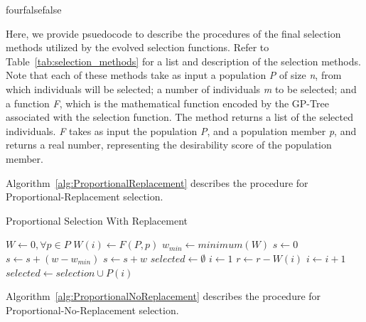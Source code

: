 \documentclass[times,12pt,titlepage]{mstogs}
\begin{document}

\begin{ThesisAppendix}{four}{false}{false}


\label{apx:SelectionPsuedocode}

Here, we provide psuedocode to describe the procedures of the final selection methods utilized by the evolved selection functions. Refer to Table~\ref{tab:selection_methods} for a list and description of the selection methods. Note that each of these methods take as input a population \textit{P} of size \textit{n}, from which individuals will be selected; a number of individuals \textit{m} to be selected; and a function \textit{F}, which is the mathematical function encoded by the GP-Tree associated with the selection function. The method returns a list of the selected individuals. \textit{F} takes as input the population \textit{P}, and a population member \textit{p}, and returns a real number, representing the desirability score of the population member.

Algorithm~\ref{alg:ProportionalReplacement} describes the procedure for Proportional-Replacement selection.

\begin{algorithm}
\caption{Proportional Selection With Replacement}
\label{alg:ProportionalReplacement}
\begin{algorithmic}[1]
 \label{proc:ProportionalReplacement}
	\State $W \leftarrow 0,\forall p \in P$
		\State $W(i) \leftarrow F(P,p)$
	\EndFor
	\State $w_{min} \leftarrow minimum(W)$	
	\State $s \leftarrow 0$
			\State $s \leftarrow s + (w - w_{min} )$			
		\Else
			\State $s \leftarrow s + w$		
		\EndIf	
	\EndFor
	\State $selected \leftarrow \emptyset$
		\State $i \leftarrow 1$
			\State $r \leftarrow r - W(i)$
			\State $i \leftarrow i + 1$
		\EndWhile	
		\State $selected \leftarrow selection \cup P(i)$
	\EndFor
\EndFunction
\end{algorithmic}
\end{algorithm}

Algorithm~\ref{alg:ProportionalNoReplacement} describes the procedure for Proportional-No-Replacement selection.


\end{ThesisAppendix}
\end{document}
